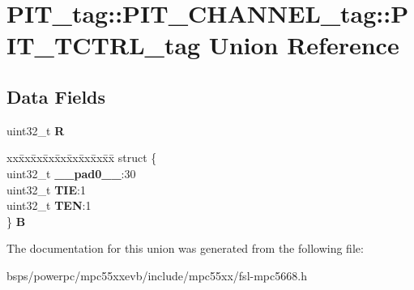 \hypertarget{unionPIT__tag_1_1PIT__CHANNEL__tag_1_1PIT__TCTRL__tag}{}\section{P\+I\+T\+\_\+tag\+::P\+I\+T\+\_\+\+C\+H\+A\+N\+N\+E\+L\+\_\+tag\+::P\+I\+T\+\_\+\+T\+C\+T\+R\+L\+\_\+tag Union Reference}
\label{unionPIT__tag_1_1PIT__CHANNEL__tag_1_1PIT__TCTRL__tag}
\subsection*{Data Fields}
\begin{DoxyCompactItemize}
\item 
\mbox{\label{unionPIT__tag_1_1PIT__CHANNEL__tag_1_1PIT__TCTRL__tag_ae538870cdab776ab2ac840a85461ab37}} 
uint32\+\_\+t {\bfseries R}
\item 
\mbox{\label{unionPIT__tag_1_1PIT__CHANNEL__tag_1_1PIT__TCTRL__tag_abfe4bd2c110e1523b5b319f9bc37882f}} 
\begin{tabbing}
xx\=xx\=xx\=xx\=xx\=xx\=xx\=xx\=xx\=\kill
struct \{\\
\>uint32\_t {\bfseries \_\_pad0\_\_}:30\\
\>uint32\_t {\bfseries TIE}:1\\
\>uint32\_t {\bfseries TEN}:1\\
\} {\bfseries B}\\

\end{tabbing}\end{DoxyCompactItemize}


The documentation for this union was generated from the following file\+:\begin{DoxyCompactItemize}
\item 
bsps/powerpc/mpc55xxevb/include/mpc55xx/fsl-\/mpc5668.\+h\end{DoxyCompactItemize}
